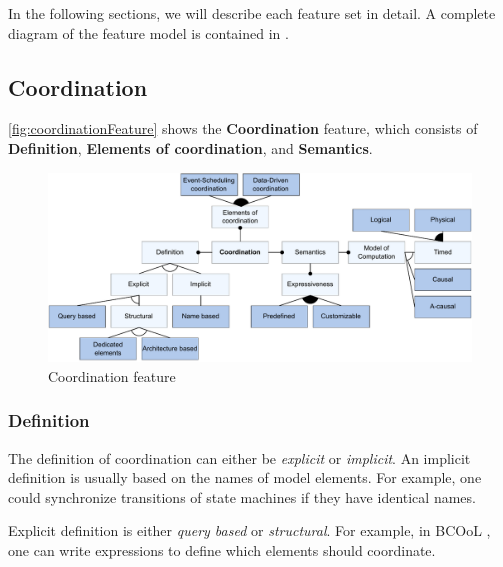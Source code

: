 \documentclass[runningheads]{llncs}
\begin{document}
In the following sections, we will describe each feature set in detail.
A complete diagram of the feature model is contained in \cite{timkrauterArtifactsCoordination2024}.

\subsection{Coordination}

\autoref{fig:coordinationFeature} shows the \textbf {Coordination} feature, which consists of \textbf{Definition}, \textbf{Elements of coordination}, and \textbf{Semantics}.

\begin{figure}[ht]
	\centering
	\includegraphics[width=1\textwidth]{images/coordination_feature}
	\caption{Coordination feature}
	\label{fig:coordinationFeature}
\end{figure}

\subsubsection{Definition} The definition of coordination can either be \textit{explicit} or \textit{implicit}.
An implicit definition is usually based on the names of model elements.
For example, one could synchronize transitions of state machines if they have identical names.

Explicit definition is either \textit{query based} or \textit{structural}.
For example, in BCOoL \cite{varalarsenBCOolBehavioralCoordination2016,varalarsenBehavioralCoordinationOperator2015}, one can write expressions to define which elements should coordinate.
\end{document}
